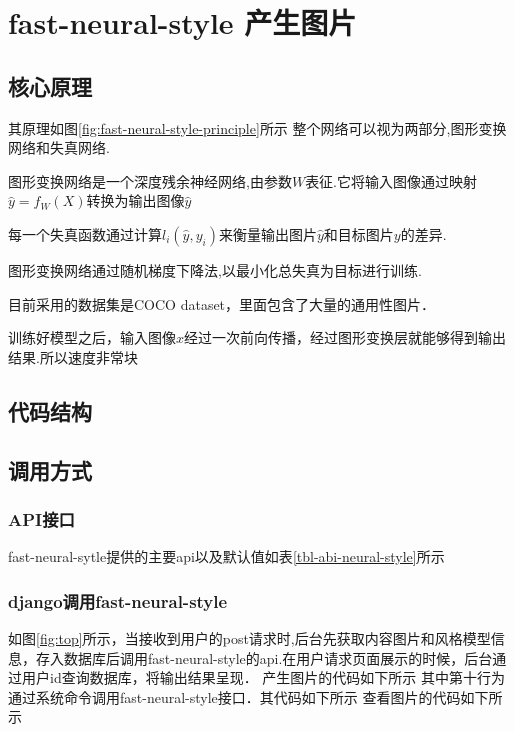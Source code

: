 \section{fast-neural-style 产生图片}
\subsection{核心原理}
其原理如图\ref{fig:fast-neural-style-principle}所示
整个网络可以视为两部分,图形变换网络和失真网络.

图形变换网络是一个深度残余神经网络,由参数$W$表征.它将输入图像通过映射$\hat y=f_W(X)$转换为输出图像$\hat y$

每一个失真函数通过计算$l_i(\hat y,y_i)$来衡量输出图片$\hat y$和目标图片$y$的差异.

图形变换网络通过随机梯度下降法,以最小化总失真为目标进行训练.

目前采用的数据集是COCO dataset，里面包含了大量的通用性图片．

训练好模型之后，输入图像$x$经过一次前向传播，经过图形变换层就能够得到输出结果.所以速度非常块
\subsection{代码结构}

\subsection{调用方式}

\subsubsection{API接口}
fast-neural-sytle提供的主要api以及默认值如表\ref{tbl-abi-neural-style}所示
\subsubsection{django调用fast-neural-style}
如图\ref{fig:top}所示，当接收到用户的post请求时,后台先获取内容图片和风格模型信息，存入数据库后调用fast-neural-style的api.在用户请求页面展示的时候，后台通过用户id查询数据库，将输出结果呈现．
产生图片的代码如下所示
其中第十行为通过系统命令调用fast-neural-style接口．其代码如下所示
查看图片的代码如下所示


